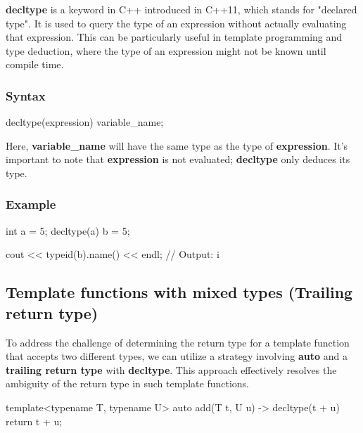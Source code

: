\documentclass{report}
\begin{document}
\begin{concept}
    \bigbreak \noindent 
    \begin{concept}
        \textbf{decltype} is a keyword in C++ introduced in C++11, which stands for "declared type". It is used to query the type of an expression without actually evaluating that expression. This can be particularly useful in template programming and type deduction, where the type of an expression might not be known until compile time.
    \end{concept}
    \bigbreak \noindent 
    \subsubsection{Syntax}
    \bigbreak \noindent 
    \begin{cppcode}
        decltype(expression) variable_name;
    \end{cppcode}
    \bigbreak \noindent 
    Here, \textbf{variable\_name} will have the same type as the type of \textbf{expression}. It's important to note that \textbf{expression} is not evaluated; \textbf{decltype} only deduces its type.
    \bigbreak \noindent 
    \subsubsection{Example}
    \bigbreak \noindent 
    \begin{cppcode}
    int a = 5;
    decltype(a) b = 5;

    cout << typeid(b).name() << endl; // Output: i
    \end{cppcode}

    \bigbreak \noindent 
    \subsection{Template functions with mixed types (Trailing return type)}
    \bigbreak \noindent 
    \begin{concept}
        To address the challenge of determining the return type for a template function that accepts two different types, we can utilize a strategy involving \textbf{auto} and a \textbf{trailing return type} with \textbf{decltype}. This approach effectively resolves the ambiguity of the return type in such template functions.
    \end{concept}
    \bigbreak \noindent 
    \begin{cppcode}
        template<typename T, typename U>
        auto add(T t, U u) -> decltype(t + u) {
            return t + u;
        }
    \end{cppcode}


\end{concept}
\end{document}
